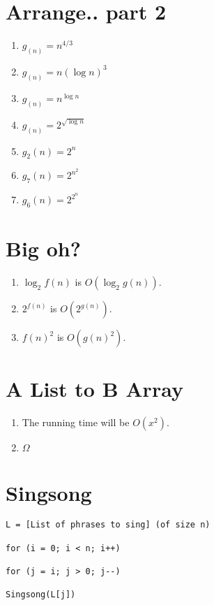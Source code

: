 \documentclass[10pt,reqno,sumlimits]{amsart}
\theoremstyle{plain}
\theoremstyle{definition}
\newcommand{\1}{{\bf 1}}
\numberwithin{equation}{section}
\begin{document}
\section{Arrange.. part 2}

\begin{enumerate}
\item $g_(n) = n^{4/3}$
\item $g_(n) = n(\log n)^3 $
\item $g_(n) = n^{\log n}$
\item $g_(n) = 2^{\sqrt{\log n}}$
\item $g_2(n) = 2^n$
\item $g_7(n) = 2^{n^2}$
\item $g_6(n) = 2^{2^n}$
\end{enumerate}

\section{Big oh?}
\begin{enumerate}
\item $\log _2f(n)$ is $O(\log _2g(n))$.
\item $2^{f(n)}$ is $O(2^{g(n)})$.
\item $f(n)^2$ is $O(g(n)^2)$.
\end{enumerate}

\section{A List to B Array}
\begin{enumerate}
\item The running time will be $O(x^2)$.
\item $\Omega$
\end{enumerate}

\section{Singsong}
\begin{verbatim}
L = [List of phrases to sing] (of size n)

for (i = 0; i < n; i++)

for (j = i; j > 0; j--)

Singsong(L[j])
\end{verbatim}
\end{document}
